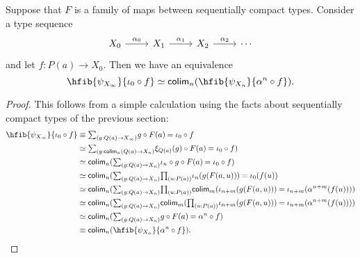 \begin{lem}\label{lem}
Suppose that $F$ is a family of maps between sequentially compact types. Consider a type sequence
\begin{equation*}
\begin{tikzcd}
X_0 \arrow[r,"\alpha_0"] & X_1 \arrow[r,"\alpha_1"] & X_2 \arrow[r,"\alpha_2"] & \cdots
\end{tikzcd}
\end{equation*}
and let $f:P(a)\to X_0$. Then we have an equivalence
\begin{equation*}
\eqv{\hfib{\psi_{X_\infty}}{\iota_0\circ f}}{\tfcolim_n(\hfib{\psi_{X_n}}{\alpha^n\circ f})}.
\end{equation*}
\end{lem}

\begin{proof}
This follows from a simple calculation using the facts about sequentially compact
types of the previous section:
\begin{align*}
\hfib{\psi_{X_\infty}}{\iota_0\circ f}
  & \jdeq
\sm{g:Q(a)\to X_\infty} \id{g\circ F(a)}{\iota_0\circ f} \\
& \eqvsym \sm{g:\tfcolim_n(Q(a)\to X_n} \id{\xi_{Q(a)}(g)\circ F(a)}{\iota_0\circ f}) \\
& \eqvsym \tfcolim_n(\sm{g:Q(a)\to X_n} \id{\iota_n\circ g\circ F(a)}{\iota_0\circ f}) \\
& \eqvsym \tfcolim_n(\sm{g:Q(a)\to X_n} \prd{u:P(a)}\id{\iota_n(g(F(a,u)))}{\iota_0(f(u))} \\
& \eqvsym \tfcolim_n(\sm{g:Q(a)\to X_n} \prd{u:P(a)}\tfcolim_m(\id{\iota_{n+m}(g(F(a,u)))}{\iota_{n+m}(\alpha^{n+m}(f(u)))}) \\
& \eqvsym \tfcolim_n(\sm{g:Q(a)\to X_n} \tfcolim_m(\prd{u:P(a)}\id{\iota_{n+m}(g(F(a,u)))}{\iota_{n+m}(\alpha^{n+m}(f(u)))}) \\
& \eqvsym \tfcolim_n(\sm{g:Q(a)\to X_n} \id{g\circ F(a)}{\alpha^n\circ f}) \\
& \jdeq \tfcolim_n(\hfib{\psi_{X_n}}{\alpha^n\circ f}).\qedhere
\end{align*}
\end{proof}

\begin{comment}
\begin{rmk}
We have an equivalence
\begin{align*}
\hfib{\psi_{X}(a)}{f}
& = \sm{g:Q(a)\to X} g\circ F(a) = f
\end{align*}
This is contractible if and only if there is a term
\begin{align*}
j(f) & : Q(a)\to X \\
J(f) & : j(f)\circ F(a) = f \\
k(f) & : \prd{g:Q(a)\to X}{H:g\circ F(a)=f} g = j(f) \\
K(f) & : \prd{g:Q(a)\to X}{H:g\circ F(a)=f} \trans{k(f)}{H} = J(f).
\end{align*}
\end{rmk}
\end{comment}

